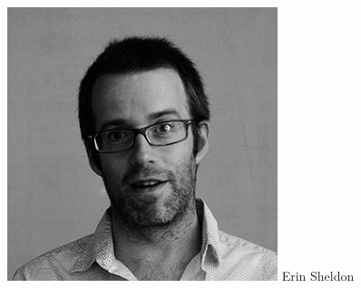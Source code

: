 \documentclass[aspectratio=169]{beamer}
\begin{document}
{\begin{columns}
        \begin{column}{0.3\textwidth}
            \begin{center}
                \includegraphics[width=\textwidth]{sheldon.png}
                \newline
                {\tiny Erin Sheldon}
            \end{center}
        \end{column}

    \end{columns}

}

{
\frame
{
}
}
\end{document}
